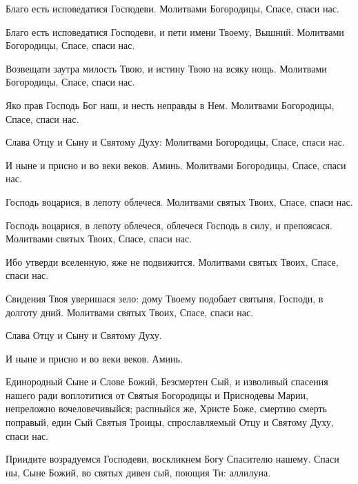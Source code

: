 \begin{mymulticols}


 Благо есть исповедатися Господеви. Молитвами Богородицы, Спасе, спаси нас. 

 Благо есть исповедатися Господеви, и пети имени Твоему, Вышний. Молитвами Богородицы, Спасе, спаси нас. 

 Возвещати заутра милость Твою, и истину Твою на всяку нощь. Молитвами Богородицы, Спасе, спаси нас. 

 Яко прав Господь Бог наш, и несть неправды в Нем. Молитвами Богородицы, Спасе, спаси нас.

 Слава Отцу и Сыну и Святому Духу: Молитвами Богородицы, Спасе, спаси нас.

 И ныне и присно и во веки веков. Аминь. Молитвами Богородицы, Спасе, спаси нас.


 Господь воцарися, в лепоту облечеся. Молитвами святых Твоих, Спасе, спаси нас. 

 Господь воцарися, в лепоту облечеся, облечеся Господь в силу, и препоясася. Молитвами святых Твоих, Спасе, спаси нас.

 Ибо утверди вселенную, яже не подвижится. Молитвами святых Твоих, Спасе, спаси нас.

 Свидения Твоя уверишася зело: дому Твоему подобает святыня, Господи, в долготу дний. Молитвами святых Твоих, Спасе, спаси нас.

 Слава Отцу и Сыну и Святому Духу. 

 И ныне и присно и во веки веков. Аминь. 


 Единородный Сыне и Слове Божий, Безсмертен Сый, и изволивый спасения нашего ради воплотитися от Святыя Богородицы и Приснодевы Марии, непреложно вочеловечивыйся; распныйся же, Христе Боже, смертию смерть поправый, един Сый Святыя Троицы, спрославляемый Отцу и Святому Духу, спаси нас. 


 Приидите возрадуемся Господеви, воскликнем Богу Спасителю нашему. Спаси ны, Сыне Божий, во святых дивен сый, поющия Ти: аллилуиа. 


\end{mymulticols}
